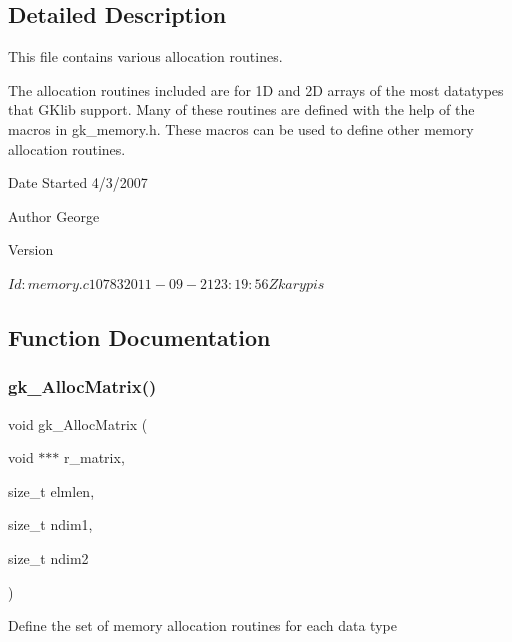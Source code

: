 \subsection{Detailed Description}
This file contains various allocation routines. 

The allocation routines included are for 1D and 2D arrays of the most datatypes that G\+Klib support. Many of these routines are defined with the help of the macros in gk\+\_\+memory.\+h. These macros can be used to define other memory allocation routines.

\begin{DoxyDate}{Date}
Started 4/3/2007 
\end{DoxyDate}
\begin{DoxyAuthor}{Author}
George 
\end{DoxyAuthor}
\begin{DoxyVersion}{Version}
\begin{DoxyVerb}$Id: memory.c 10783 2011-09-21 23:19:56Z karypis $ \end{DoxyVerb}
 
\end{DoxyVersion}


\subsection{Function Documentation}
\mbox{\label{a00110_af59ba46496f920cc424b8088f4cd7818}} 
\subsubsection{\texorpdfstring{gk\+\_\+\+Alloc\+Matrix()}{gk\_AllocMatrix()}}
{\footnotesize\ttfamily void gk\+\_\+\+Alloc\+Matrix (\begin{DoxyParamCaption}\item[{void $\ast$$\ast$$\ast$}]{r\+\_\+matrix,  }\item[{size\+\_\+t}]{elmlen,  }\item[{size\+\_\+t}]{ndim1,  }\item[{size\+\_\+t}]{ndim2 }\end{DoxyParamCaption})}

Define the set of memory allocation routines for each data type

